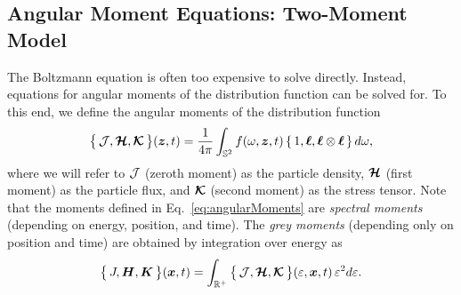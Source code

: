 \subsection{Angular Moment Equations: Two-Moment Model}

The Boltzmann equation is often too expensive to solve directly.  
Instead, equations for angular moments of the distribution function can be solved for.  
To this end, we define the angular moments of the distribution function
\begin{equation}
  \big\{\,\mathcal{J},\boldsymbol{\mathcal{H}},\boldsymbol{\mathcal{K}}\,\big\}(\boldsymbol{z},t)
  =\frac{1}{4\pi}\int_{\mathbb{S}^{2}}f(\omega,\boldsymbol{z},t)\,\{\,1,\boldsymbol{\ell},\boldsymbol{\ell}\otimes\boldsymbol{\ell}\,\}\,d\omega,
  \label{eq:angularMoments}
\end{equation}
where we will refer to $\mathcal{J}$ (zeroth moment) as the particle density, $\boldsymbol{\mathcal{H}}$ (first moment) as the particle flux, and $\boldsymbol{\mathcal{K}}$ (second moment) as the stress tensor.  
Note that the moments defined in Eq.~\eqref{eq:angularMoments} are \emph{spectral moments} (depending on energy, position, and time).  
The \emph{grey moments} (depending only on position and time) are obtained by integration over energy as
\begin{equation}
  \big\{\,J,\boldsymbol{H},\boldsymbol{K}\,\big\}(\boldsymbol{x},t)
  =\int_{\mathbb{R}^{+}}\big\{\,\mathcal{J},\boldsymbol{\mathcal{H}},\boldsymbol{\mathcal{K}}\,\big\}(\varepsilon,\boldsymbol{x},t)\,\varepsilon^{2}d\varepsilon.  
\end{equation}

